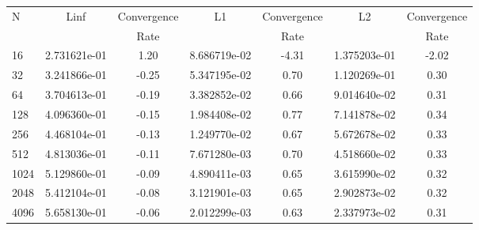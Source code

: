 \documentclass[12pt]{article}
\begin{document}
	\begin{tabular}{l|c|c|c|c|c|c}
		N&Linf&Convergence&L1&Convergence&L2&Convergence\\
		&&Rate&&Rate&&Rate\\
		\hline
		16&2.731621e-01&1.20&8.686719e-02&-4.31&1.375203e-01&-2.02\\
		\hline
		32&3.241866e-01&-0.25&5.347195e-02&0.70&1.120269e-01&0.30\\
		\hline
		64&3.704613e-01&-0.19&3.382852e-02&0.66&9.014640e-02&0.31\\
		\hline
		128&4.096360e-01&-0.15&1.984408e-02&0.77&7.141878e-02&0.34\\
		\hline
		256&4.468104e-01&-0.13&1.249770e-02&0.67&5.672678e-02&0.33\\
		\hline
		512&4.813036e-01&-0.11&7.671280e-03&0.70&4.518660e-02&0.33\\
		\hline
		1024&5.129860e-01&-0.09&4.890411e-03&0.65&3.615990e-02&0.32\\
		\hline
		2048&5.412104e-01&-0.08&3.121901e-03&0.65&2.902873e-02&0.32\\
		\hline
		4096&5.658130e-01&-0.06&2.012299e-03&0.63&2.337973e-02&0.31\\
	\end{tabular}
\end{document}
